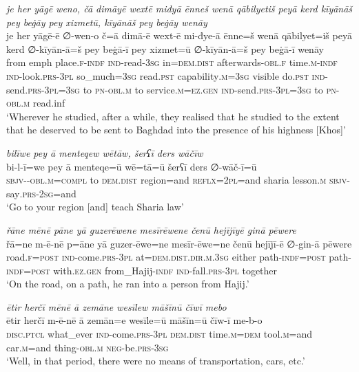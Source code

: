 \ea \label{ŽP.80}
\textit{je her yāgē weno, čā dimāyē wextē miđyā ēnneš wenā qābilyetiš peyā kerd kīyānāš pey beġāy pey xizmetū, kīyānāš pey beġāy wenāy} \\ 
\gll je her yāgē-ē ∅-wen-o č=ā dimā-ē wext-ē mi-đye-ā ēnne=š wenā qābilyet=iš peyā kerd ∅-kīyān-ā=š pey beġā-ī pey xizmet=ū ∅-kīyān-ā=š pey beġā-ī wenāy \\ 
 from emph place\textsc{.f}\textsc{-indf} \textsc{ind-}read\textsc{-3sg} in=\textsc{dem.dist} afterwards\textsc{-obl}\textsc{.f} time\textsc{.m}\textsc{-indf} \textsc{ind-}look\textsc{.prs}\textsc{-3pl} so\_much\textsc{=3sg} read\textsc{.pst} capability\textsc{.m}\textsc{=3sg} visible do\textsc{.pst} \textsc{ind-}send\textsc{.prs}\textsc{-3pl}\textsc{=3sg} to \textsc{pn}\textsc{-obl}\textsc{.m} to service\textsc{.m}\textsc{\textsc{=ez.gen}} \textsc{ind-}send\textsc{.prs}\textsc{-3pl}\textsc{=3sg} to \textsc{pn}\textsc{-obl}\textsc{.m} read.inf \\ 
\glt `Wherever he studied, after a while, they realised that he studied to the extent that he deserved to be sent to Baghdad into the presence of his highness [Khos]'
\z 
 
\ea \label{ŽP.93}
\textit{bilīwe pey ā menteqew wētāw, šerʕī ders wāčīw} \\ 
\gll bi-l-ī=we pey ā menteqe=ū wē=tā=ū šerʕī ders ∅-wāč-ī=ū \\ 
 \textsc{sbjv-}\textsc{-obl}\textsc{.m}\textsc{=compl} to \textsc{dem.dist} region=and \textsc{reflx}=\textsc{2pl}=and sharia lesson\textsc{.m} \textsc{sbjv-}say\textsc{.prs-}\textsc{2sg}=and \\ 
\glt `Go to your region [and] teach Sharia law'
\z 
 
\ea \label{ŽP.97}
\textit{řāne mēnē pāne yā guzerēwene mesīrēwene čenū hejījīyē ginā pēwere} \\ 
\gll řā=ne m-ē-nē p=āne yā guzer-ēwe=ne mesīr-ēwe=ne čenū hejījī-ē ∅-gin-ā pēwere \\ 
 road\textsc{.f}\textsc{=\textsc{post}} \textsc{ind-}come\textsc{.prs}\textsc{-3pl} at=\textsc{dem.dist}\textsc{.dir}\textsc{.m}\textsc{.3sg} either path\textsc{-indf}\textsc{=\textsc{post}} path\textsc{-indf}\textsc{=\textsc{post}} with\textsc{.ez.gen} from\_Hajij\textsc{-indf} \textsc{ind-}fall\textsc{.prs}\textsc{-3pl} together \\ 
\glt `On the road, on a path, he ran into a person from Hajij.'
\z 
 
\ea \label{ŽP.98}
\textit{ētir herčī mēnē ā zemāne wesīlew māšīnū čīwī mebo} \\ 
\gll ētir herčī m-ē-nē ā zemān=e wesīle=ū māšīn=ū čīw-ī me-b-o \\ 
 \textsc{disc.ptcl} what\_ever \textsc{ind-}come\textsc{.prs}\textsc{-3pl} \textsc{dem.dist} time\textsc{.m}\textsc{=dem} tool\textsc{.m}=and car\textsc{.m}=and thing\textsc{-obl}\textsc{.m} \textsc{neg-}be\textsc{.prs}\textsc{-3sg} \\ 
\glt `Well, in that period, there were no means of transportation, cars, etc.'
\z 
 
